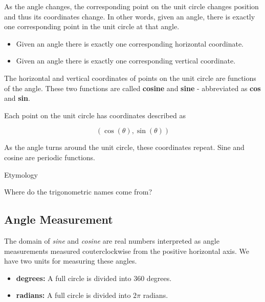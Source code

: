 \documentclass{ximera}
\begin{document}
\begin{example}
As the angle changes, the corresponding point on the unit circle changes position and thus its coordinates change.  In other words, given an angle, there is exactly one corresponding point in the unit circle at that angle.  

\begin{itemize}
\item Given an angle there is exactly one corresponding horizontal coordinate.
\item Given an angle there is exactly one corresponding vertical coordinate. 
\end{itemize}


The horizontal and vertical coordinates of points on the unit circle are functions of the angle.  These two functions are called \textbf{cosine} and \textbf{sine} - abbreviated as \textbf{cos} and \textbf{sin}.

Each point on the unit circle has coordinates described as 

\[  (\cos(\theta), \sin(\theta))  \] 

As the angle turns around the unit circle, these coordinates repeat. Sine and cosine are periodic functions.

\end{example}




\begin{remark}  Etymology


Where do the trigonometric names come from?  

\end{remark}











\subsection*{Angle Measurement}

The domain of \textit{sine} and \textit{cosine} are real numbers interpreted as angle measurements measured couterclockwise from the positive horizontal axis.  We have two units for measuring these angles.


\begin{itemize}
\item \textbf{degrees:}  A full circle is divided into $360$ degrees.
\item \textbf{radians:}  A full circle is divided into $2\pi$ radians.
\end{itemize}
\end{document}
